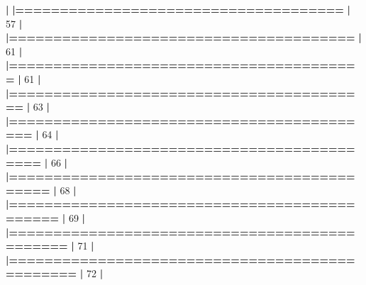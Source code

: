 \documentclass[]{book}
\newenvironment{Shaded}{\begin{snugshade}}{\end{snugshade}}
\newcommand{\DecValTok}[1]{\textcolor[rgb]{0.00,0.00,0.81}{#1}}
\newcommand{\ErrorTok}[1]{\textcolor[rgb]{0.64,0.00,0.00}{\textbf{#1}}}
\newcommand{\NormalTok}[1]{#1}
\newcommand{\OperatorTok}[1]{\textcolor[rgb]{0.81,0.36,0.00}{\textbf{#1}}}
\newcommand{\StringTok}[1]{\textcolor[rgb]{0.31,0.60,0.02}{#1}}
\begin{document}
\begin{Shaded}
\begin{Highlighting}[]
{{{{{{{{{{{{{{{{{{{{{{{{{{{{{{{{{  \OperatorTok{|}\StringTok{                                                                       }
\StringTok{  }\ErrorTok{|=====================================}\StringTok{                            }\ErrorTok{|}\StringTok{  }\DecValTok{57}\NormalTok{%}
  \OperatorTok{|}\StringTok{                                                                       }
\StringTok{  }\ErrorTok{|=======================================}\StringTok{                          }\ErrorTok{|}\StringTok{  }\DecValTok{61}\NormalTok{%}
  \OperatorTok{|}\StringTok{                                                                       }
\StringTok{  }\ErrorTok{|========================================}\StringTok{                         }\ErrorTok{|}\StringTok{  }\DecValTok{61}\NormalTok{%}
  \OperatorTok{|}\StringTok{                                                                       }
\StringTok{  }\ErrorTok{|=========================================}\StringTok{                        }\ErrorTok{|}\StringTok{  }\DecValTok{63}\NormalTok{%}
  \OperatorTok{|}\StringTok{                                                                       }
\StringTok{  }\ErrorTok{|==========================================}\StringTok{                       }\ErrorTok{|}\StringTok{  }\DecValTok{64}\NormalTok{%}
  \OperatorTok{|}\StringTok{                                                                       }
\StringTok{  }\ErrorTok{|===========================================}\StringTok{                      }\ErrorTok{|}\StringTok{  }\DecValTok{66}\NormalTok{%}
  \OperatorTok{|}\StringTok{                                                                       }
\StringTok{  }\ErrorTok{|============================================}\StringTok{                     }\ErrorTok{|}\StringTok{  }\DecValTok{68}\NormalTok{%}
  \OperatorTok{|}\StringTok{                                                                       }
\StringTok{  }\ErrorTok{|=============================================}\StringTok{                    }\ErrorTok{|}\StringTok{  }\DecValTok{69}\NormalTok{%}
  \OperatorTok{|}\StringTok{                                                                       }
\StringTok{  }\ErrorTok{|==============================================}\StringTok{                   }\ErrorTok{|}\StringTok{  }\DecValTok{71}\NormalTok{%}
  \OperatorTok{|}\StringTok{                                                                       }
\StringTok{  }\ErrorTok{|===============================================}\StringTok{                  }\ErrorTok{|}\StringTok{  }\DecValTok{72}\NormalTok{%}
  \OperatorTok{|}\StringTok{                                                                       }
}}}}}}}}}}}}}}}}}}}}}}}}}}}}}}}}}}}}}}}}}}}
\end{Highlighting}
\end{Shaded}
\end{document}
